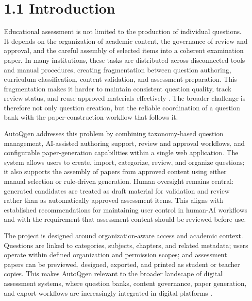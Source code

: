 
\section{1.1 Introduction}

Educational assessment is not limited to the production of individual questions. It depends on the organization of academic content, the governance of review and approval, and the careful assembly of selected items into a coherent examination paper. In many institutions, these tasks are distributed across disconnected tools and manual procedures, creating fragmentation between question authoring, curriculum classification, content validation, and assessment preparation. This fragmentation makes it harder to maintain consistent question quality, track review status, and reuse approved materials effectively \cite{mislevy2003ecd,kurdi2020}. The broader challenge is therefore not only question creation, but the reliable coordination of a question bank with the paper-construction workflow that follows it.

AutoQgen addresses this problem by combining taxonomy-based question management, AI-assisted authoring support, review and approval workflows, and configurable paper-generation capabilities within a single web application. The system allows users to create, import, categorize, review, and organize questions; it also supports the assembly of papers from approved content using either manual selection or rule-driven generation. Human oversight remains central: generated candidates are treated as draft material for validation and review rather than as automatically approved assessment items. This aligns with established recommendations for maintaining user control in human-AI workflows \cite{amershi2019} and with the requirement that assessment content should be reviewed before use.

The project is designed around organization-aware access and academic context. Questions are linked to categories, subjects, chapters, and related metadata; users operate within defined organization and permission scopes; and assessment papers can be previewed, designed, exported, and printed as student or teacher copies. This makes AutoQgen relevant to the broader landscape of digital assessment systems, where question banks, content governance, paper generation, and export workflows are increasingly integrated in digital platforms \cite{moodleQuestionBank,moodleQuestionCategories,imsQti3}.

